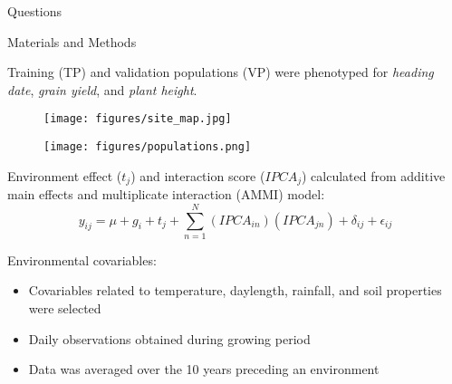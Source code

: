 \documentclass[final]{beamer}
\newlength{\onecolwid}
\begin{document}
\begin{frame}[t]
\begin{columns}[t]
\begin{column}{\onecolwid}
\begin{alertblock}{\large{Questions}}
\begin{footnotesize}
\end{footnotesize}


\end{alertblock}



\begin{block}{Materials and Methods}

Training (TP) and validation populations (VP) were phenotyped for \textit{heading date}, \textit{grain yield}, and \textit{plant height}.


\begin{figure}
  \begin{center}
  \begin{minipage}[m]{0.50\linewidth}
    \centering
    \texttt{[image: figures/site\_map.jpg]}
  \end{minipage}%
  \begin{minipage}[m]{0.50\linewidth}
    \centering
    \texttt{[image: figures/populations.png]}
  \end{minipage}%
\end{center}
\end{figure}


\vspace{1cm}

Environment effect ($t_j$) and interaction score ($IPCA_j$) calculated from additive main effects and multiplicate interaction (AMMI) model: 
  $$y_{ij} = \mu + g_i + t_j + \sum^N_{n=1} (IPCA_{in})(IPCA_{jn}) + \delta_{ij} + \epsilon_{ij}$$


\vspace{1cm}


Environmental covariables:

\begin{footnotesize}

\begin{itemize}
  \item Covariables related to temperature, daylength, rainfall, and soil properties were selected 
  \item Daily observations obtained during growing period
  \item Data was averaged over the 10 years preceding an environment
\end{itemize}


\end{footnotesize}
\end{block}
\end{column}
\end{columns}
\end{frame}
\end{document}
